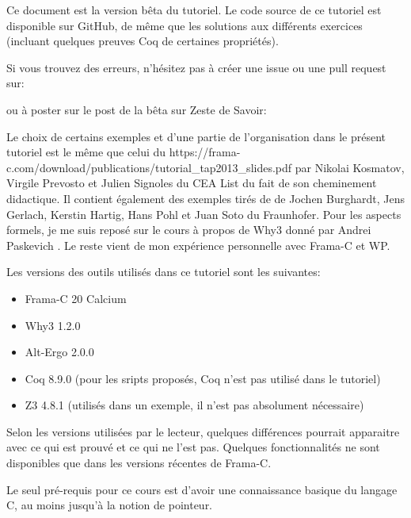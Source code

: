 \begin{Warning}
  Ce document est la version bêta du tutoriel. Le code source de ce
  tutoriel est disponible sur GitHub, de même que les solutions aux
  différents exercices (incluant quelques preuves Coq de certaines
  propriétés).

  Si vous trouvez des erreurs, n'hésitez pas à créer une issue ou
  une pull request sur:


  ou à poster sur le post de la bêta sur Zeste de Savoir:

\end{Warning}

\begin{Information}
Le choix de certains exemples et d'une partie de l'organisation dans le présent 
tutoriel est le même que celui du 
             {https://frama-c.com/download/publications/tutorial_tap2013_slides.pdf} 
par Nikolai Kosmatov, Virgile Prevosto et Julien Signoles du CEA List du fait de
son cheminement didactique. Il contient également des exemples tirés de 
\textit{} 
de Jochen Burghardt, Jens Gerlach, Kerstin Hartig, Hans Pohl et Juan Soto du 
Fraunhofer. Pour les aspects formels, je me suis reposé sur le cours
à propos de Why3 donné par Andrei Paskevich
\textit{}.
Le reste vient de mon expérience personnelle avec Frama-C et WP.

\horizontalLine

Les versions des outils utilisés dans ce tutoriel sont les suivantes:
\begin{itemize}
\item Frama-C 20 Calcium
\item Why3 1.2.0
\item Alt-Ergo 2.0.0
\item Coq 8.9.0 (pour les sripts proposés, Coq n'est pas utilisé dans le tutoriel)
\item Z3 4.8.1 (utilisés dans un exemple, il n'est pas absolument nécessaire)
\end{itemize}
Selon les versions utilisées par le lecteur, quelques différences pourrait
apparaitre avec ce qui est prouvé et ce qui ne l'est pas. Quelques fonctionnalités
ne sont disponibles que dans les versions récentes de Frama-C.

\horizontalLine

Le seul pré-requis pour ce cours est d'avoir une connaissance basique du 
langage C, au moins jusqu'à la notion de pointeur.


\end{Information}

